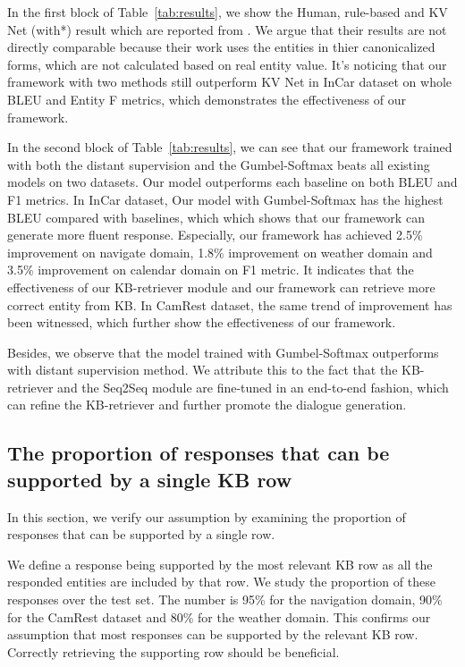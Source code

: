 \documentclass[11pt,a4paper]{article}
\begin{document}
 In the first block of Table~\ref{tab:results}, we show the Human, rule-based and KV Net (with*) result which are reported from .
We argue that their results are not directly comparable because their work uses the entities in thier canonicalized forms, which are not calculated based on real entity value. 
It's noticing that our framework with two methods still outperform KV Net in InCar dataset on whole BLEU and Entity F metrics, which demonstrates the effectiveness of our framework.
 
 In the second block of Table~\ref{tab:results}, we can see that our framework trained with both the distant supervision and the Gumbel-Softmax beats all existing models on two datasets.
 Our model outperforms each baseline on both BLEU and F1 metrics.
 In InCar dataset, Our model with Gumbel-Softmax has the highest BLEU
 compared with baselines, which 
 which shows that our framework can generate more fluent response.
 Especially, our framework has achieved 2.5\% improvement on navigate domain, 1.8\% improvement on weather domain and 3.5\% improvement on calendar domain on F1 metric. It indicates that the 
 effectiveness of our KB-retriever module and our framework can 
 retrieve more correct entity from KB.
 In CamRest dataset, the same trend of improvement has been witnessed, which further show the effectiveness of our framework.
 
 Besides, we observe that the model trained with Gumbel-Softmax outperforms with distant supervision method. 
 We attribute this to the fact that the KB-retriever and the Seq2Seq module are fine-tuned in an end-to-end fashion, which can refine the KB-retriever and further promote the dialogue generation.
 	\subsection{{The proportion of responses that can be supported by a single KB row}}
 	In this section, we verify
 	our assumption by examining the
 	proportion of responses that can be supported by a single row.
 
 We define a response being supported by the most relevant KB row
 as all the responded entities are included by
 that row.
 We study the proportion of these responses
 over the test set.
 The number is 95\%
 for the navigation domain, 90\% for the CamRest dataset
 and 80\% for the weather domain.
 This confirms our assumption
 that most responses can be supported by the relevant KB row.
 Correctly retrieving the supporting row
 should be beneficial.
 
\end{document}
